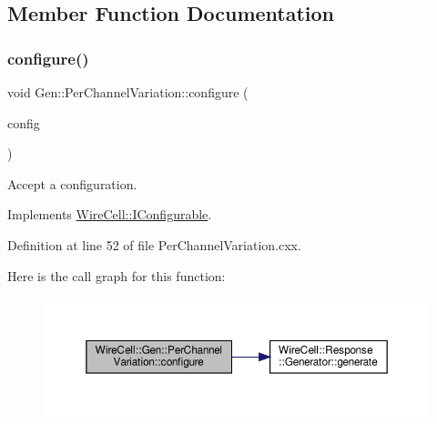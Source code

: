 \subsection{Member Function Documentation}
\mbox{\label{class_wire_cell_1_1_gen_1_1_per_channel_variation_afc90740a0c322146c135575b2d7ace12}} 
\subsubsection{\texorpdfstring{configure()}{configure()}}
{\footnotesize\ttfamily void Gen\+::\+Per\+Channel\+Variation\+::configure (\begin{DoxyParamCaption}\item[{const \hyperlink{namespace_wire_cell_a9f705541fc1d46c608b3d32c182333ee}{Wire\+Cell\+::\+Configuration} \&}]{config }\end{DoxyParamCaption})\hspace{0.3cm}{\ttfamily [virtual]}}



Accept a configuration. 



Implements \hyperlink{class_wire_cell_1_1_i_configurable_a57ff687923a724093df3de59c6ff237d}{Wire\+Cell\+::\+I\+Configurable}.



Definition at line 52 of file Per\+Channel\+Variation.\+cxx.

Here is the call graph for this function\+:
\nopagebreak
\begin{figure}[H]
\begin{center}
\leavevmode
\includegraphics[width=350pt]{class_wire_cell_1_1_gen_1_1_per_channel_variation_afc90740a0c322146c135575b2d7ace12_cgraph}
\end{center}
\end{figure}
\mbox{\label{class_wire_cell_1_1_gen_1_1_per_channel_variation_a3e974e03fff59a5add7e4f9b7a5f2107}} 
